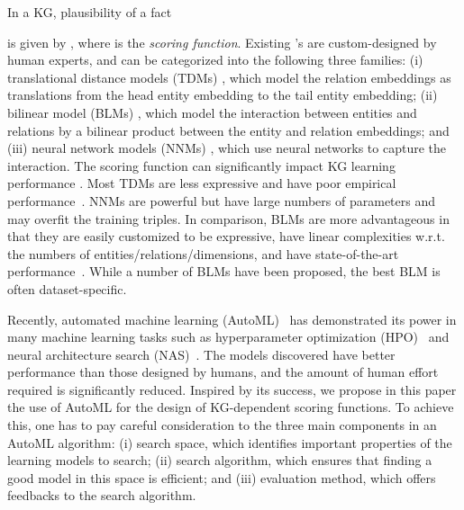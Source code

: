 \documentclass[10pt,journal,compsoc]{IEEEtran}
\begin{document}
In a KG, 
plausibility  of a fact
 
is given by , where  is the
{\em scoring function\/}. 
Existing 's are
custom-designed by human experts,
and can be categorized into the following three families:
(i) translational distance models (TDMs)
\cite{bordes2013translating,wang2014knowledge,fan2014transition,sun2019rotate},
which 
model the relation embeddings as translations from the head entity embedding
to the tail entity embedding;
(ii)
bilinear model (BLMs)
\cite{nickel2011three,yang2014embedding,trouillon2017knowledge,nickel2016holographic,liu2017analogical,kazemi2018simple,lacroix2018canonical,zhang2019quaternion},
which
model the interaction between entities and relations
by a bilinear product between the entity and relation embeddings; and (iii)
neural network models (NNMs) 
\cite{dong2014knowledge,
dettmers2017convolutional,guo2019learning,schlichtkrull2018modeling,vashishth2019composition},
which
use neural networks to capture the interaction.
The scoring function
can significantly impact KG learning performance \cite{nickel2016review,wang2017knowledge,lin2018knowledge}.
Most TDMs are less expressive and have poor empirical performance~\cite{wang2017knowledge,wang2018evaluating}.
NNMs are powerful but have
large numbers of parameters and may overfit the training triples.
In comparison, 
BLMs  
are more advantageous in that they are 
easily customized to be expressive,
have linear complexities w.r.t. the numbers of entities/relations/dimensions,
and have state-of-the-art performance~\cite{lacroix2018canonical}.
While a number of BLMs have been proposed,
the best BLM is often dataset-specific.


Recently, 
automated machine learning (AutoML)~\cite{quanming2018auto,automl_book}
has demonstrated 
its power in many machine learning tasks such as 
hyperparameter optimization (HPO)~\cite{feurer2015efficient}
and neural architecture search
(NAS)~\cite{zoph2017neural,liu2018darts,elsken2019neural}.
The models discovered have better performance than those
designed by
humans, and 
the amount of human effort required is
significantly reduced.
Inspired by its success,
we propose 
in this paper 
the use of AutoML for the design  of
KG-dependent scoring functions.
To achieve this, one has to 
pay careful consideration to the
three main components in 
an AutoML algorithm:
(i) search space, 
which identifies important properties of the learning models
to search;
(ii) search algorithm, which ensures that
finding a good model in this space
is efficient;
and 
(iii) evaluation method,
which offers feedbacks to the search algorithm.
\end{document}
